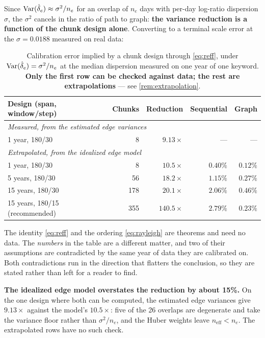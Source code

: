 \documentclass[12pt,a4paper,oneside]{article}
\begin{document}
\begin{remark}\label{rem:designtool}
Since $\operatorname{Var}(\hat\delta_e) \approx \sigma^2/n_e$ for an overlap of $n_e$ days with
per-day log-ratio dispersion $\sigma$, the $\sigma^2$ cancels in the ratio of
path to graph: \textbf{the variance reduction is a function of the chunk design
alone}. Converting to a terminal scale error at the $\sigma = 0.0188$ measured on
real data:

\begin{table}[H]
\centering
\small
\caption{Calibration error implied by a chunk design through \eqref{eq:reff},
under $\operatorname{Var}(\hat\delta_e)=\sigma^2/n_e$ at the median dispersion measured on one
year of one keyword. \textbf{Only the first row can be checked against data; the
rest are extrapolations} --- see \cref{rem:extrapolation}.}
\label{tab:designreff}
\begin{tabular}{lrrrr}
\toprule
Design (span, window/step) & Chunks & Reduction & Sequential & Graph\\
\midrule
\multicolumn{5}{l}{\emph{Measured, from the estimated edge variances}}\\
1 year, 180/30 & 8 & $\mathbf{9.13\times}$ & --- & ---\\
\midrule
\multicolumn{5}{l}{\emph{Extrapolated, from the idealized edge model}}\\
1 year, 180/30 & 8 & $10.5\times$ & $0.40\%$ & $0.12\%$\\
5 years, 180/30 & 56 & $18.2\times$ & $1.15\%$ & $0.27\%$\\
15 years, 180/30 & 178 & $20.1\times$ & $2.06\%$ & $0.46\%$\\
15 years, 180/15 (recommended) & 355 & $140.5\times$ & $2.79\%$ & $0.23\%$\\
\bottomrule
\end{tabular}
\end{table}

\begin{remark}\label{rem:extrapolation}
The identity \eqref{eq:reff} and the ordering \eqref{eq:rayleigh} are theorems and
need no data. The \emph{numbers} in the table are a different matter, and two of
their assumptions are contradicted by the same year of data they are calibrated
on. Both contradictions run in the direction that flatters the conclusion, so
they are stated rather than left for a reader to find.

\textbf{The idealized edge model overstates the reduction by about 15\%.} On the
one design where both can be computed, the estimated edge variances give
$9.13\times$ against the model's $10.5\times$: five of the 26 overlaps are
degenerate and take the variance floor rather than $\sigma^2/n_e$, and the Huber
weights leave $n_{\mathrm{eff}}<n_e$. The extrapolated rows have no such check.


\end{remark}
\end{remark}
\end{document}
